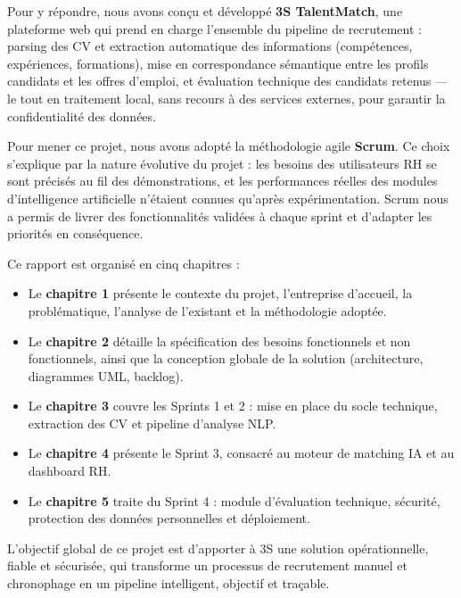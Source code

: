\documentclass[12pt,a4paper]{report}
\begin{document}
Pour y répondre, nous avons conçu et développé \textbf{3S TalentMatch}, une plateforme web qui prend en charge l'ensemble du pipeline de recrutement : parsing des CV et extraction automatique des informations (compétences, expériences, formations), mise en correspondance sémantique entre les profils candidats et les offres d'emploi, et évaluation technique des candidats retenus --- le tout en traitement local, sans recours à des services externes, pour garantir la confidentialité des données.

Pour mener ce projet, nous avons adopté la méthodologie agile \textbf{Scrum}. Ce choix s'explique par la nature évolutive du projet : les besoins des utilisateurs RH se sont précisés au fil des démonstrations, et les performances réelles des modules d'intelligence artificielle n'étaient connues qu'après expérimentation. Scrum nous a permis de livrer des fonctionnalités validées à chaque sprint et d'adapter les priorités en conséquence.

Ce rapport est organisé en cinq chapitres :

\begin{itemize}
  \item Le \textbf{chapitre 1} présente le contexte du projet, l'entreprise d'accueil, la problématique, l'analyse de l'existant et la méthodologie adoptée.
  \item Le \textbf{chapitre 2} détaille la spécification des besoins fonctionnels et non fonctionnels, ainsi que la conception globale de la solution (architecture, diagrammes UML, backlog).
  \item Le \textbf{chapitre 3} couvre les Sprints 1 et 2 : mise en place du socle technique, extraction des CV et pipeline d'analyse NLP.
  \item Le \textbf{chapitre 4} présente le Sprint 3, consacré au moteur de matching IA et au dashboard RH.
  \item Le \textbf{chapitre 5} traite du Sprint 4 : module d'évaluation technique, sécurité, protection des données personnelles et déploiement.
\end{itemize}

L'objectif global de ce projet est d'apporter à 3S une solution opérationnelle, fiable et sécurisée, qui transforme un processus de recrutement manuel et chronophage en un pipeline intelligent, objectif et traçable.

\newpage

\end{document}
